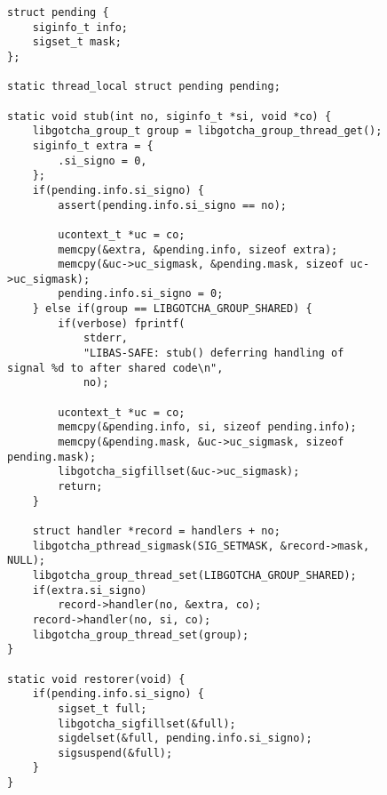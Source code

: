 \begin{figure}
\begin{lstlisting}[label=lst:assafe_helpers,caption=\textit{libas-safe}'s signal handler wrapper and control library callback]
struct pending {
	siginfo_t info;
	sigset_t mask;
};

static thread_local struct pending pending;

static void stub(int no, siginfo_t *si, void *co) {
	libgotcha_group_t group = libgotcha_group_thread_get();
	siginfo_t extra = {
		.si_signo = 0,
	};
	if(pending.info.si_signo) {
		assert(pending.info.si_signo == no);

		ucontext_t *uc = co;
		memcpy(&extra, &pending.info, sizeof extra);
		memcpy(&uc->uc_sigmask, &pending.mask, sizeof uc->uc_sigmask);
		pending.info.si_signo = 0;
	} else if(group == LIBGOTCHA_GROUP_SHARED) {
		if(verbose) fprintf(
			stderr,
			"LIBAS-SAFE: stub() deferring handling of signal %d to after shared code\n",
			no);

		ucontext_t *uc = co;
		memcpy(&pending.info, si, sizeof pending.info);
		memcpy(&pending.mask, &uc->uc_sigmask, sizeof pending.mask);
		libgotcha_sigfillset(&uc->uc_sigmask);
		return;
	}

	struct handler *record = handlers + no;
	libgotcha_pthread_sigmask(SIG_SETMASK, &record->mask, NULL);
	libgotcha_group_thread_set(LIBGOTCHA_GROUP_SHARED);
	if(extra.si_signo)
		record->handler(no, &extra, co);
	record->handler(no, si, co);
	libgotcha_group_thread_set(group);
}

static void restorer(void) {
	if(pending.info.si_signo) {
		sigset_t full;
		libgotcha_sigfillset(&full);
		sigdelset(&full, pending.info.si_signo);
		sigsuspend(&full);
	}
}
\end{lstlisting}
\end{figure}

\begin{promotesubsections}

\end{promotesubsections}
